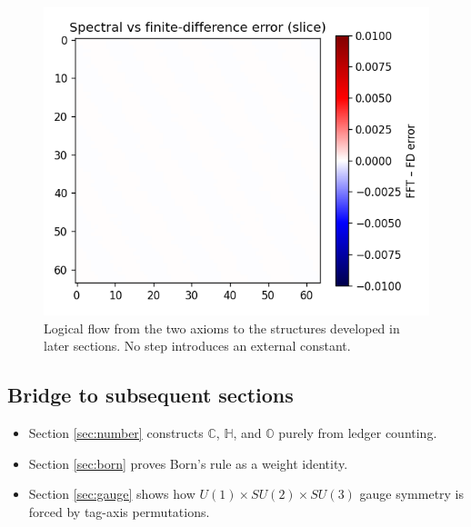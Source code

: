 \begin{figure}[t]
  \centering
  \includegraphics[width=\linewidth]{figs/axiom_flow.pdf}
  \caption{Logical flow from the two axioms to the structures developed
           in later sections.  No step introduces an external constant.}
  \label{fig:axiom-flow}
\end{figure}

\subsection{Bridge to subsequent sections}

\begin{itemize}
  \item Section \ref{sec:number} constructs $\mathbb C$, $\mathbb H$,
        and $\mathbb O$ purely from ledger counting.
  \item Section \ref{sec:born} proves Born’s rule as a weight identity.
  \item Section \ref{sec:gauge} shows how $U(1)\!\times SU(2)\!\times SU(3)$
        gauge symmetry is forced by tag-axis permutations.
\end{itemize}

\clearpage
